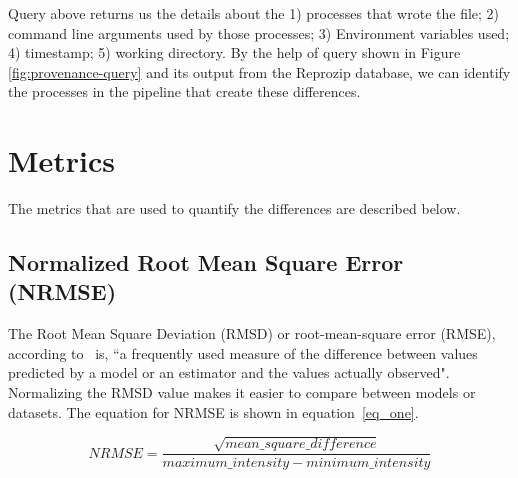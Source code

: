 Query above returns us the details about the 1) processes that wrote the file; 2) command line arguments used by those processes; 3) Environment variables used; 4) timestamp; 5) working directory. By the help of query shown in Figure \ref{fig:provenance-query} and its output from the Reprozip database, we can identify the processes in the pipeline that create these differences.

\section{Metrics} \label{sec:num1}
The metrics that are used to quantify the differences are described below.

\subsection{Normalized Root Mean Square Error (NRMSE)}
The Root Mean Square Deviation (RMSD) or root-mean-square error (RMSE), according to~\cite{khosrow2017handbook} is, ``a frequently used measure of the difference between values predicted by a model or an estimator and the values actually observed". Normalizing the RMSD value makes it easier to compare between models or datasets. The equation for NRMSE is shown in equation~\ref{eq_one}.

\begin{equation}
  \label{eq_one}
    NRMSE = \frac{\sqrt{mean\_square\_difference}}{maximum\_intensity - minimum\_intensity}
\end{equation}

\iffalse
\hrulefill
\caption*{\textbf{Algorithm 2:} Algorithm for finding the normalized root mean square value}
\label{alg:algorithm_diff}
\hrulefill

\DontPrintSemicolon
\SetKwFunction{FMain}{Convert\_image}
\SetKwProg{Fn}{Function}{:}{}
\Fn{\FMain{$image$}}{
  \begin{algorithmic}[1]
    \IF{image extension is ``.mgz":}
      \STATE convert image to ``.nii"
    \ELSE
      \STATE do nothing
    \ENDIF
  \end{algorithmic}
\KwRet image\;
}
\hfill \break
\hfill \break
\SetKwFunction{FNrmse}{Get\_NRMSE}
\SetKwProg{Pn}{Function}{:}{}
\Pn{\FNrmse{$image\-1$,$image\-2$}}{
  \begin{algorithmic}[1]
    \STATE image\_1 $\leftarrow$ Convert\_image(image\-1);
    \STATE image\_2 $\leftarrow$ Convert\_image(image\-2);
    \STATE minimum\_intensity $\leftarrow$ get the min. intensity value from image\_1; \COMMENT{using FSL}
    \STATE maximum\_intensity $\leftarrow$ get the max. intensity value from image\_1;
    \STATE \textbf{fslmaths} image\-1 \text{-sub} image\-2 \text{-sqr} $\rightarrow$ diff; \COMMENT{computing the mean square difference using FSL}
    \STATE meandifference $\leftarrow$ \textbf{fslstats} diff -m ; \COMMENT{get the mean square difference}
    \STATE \textbf{NRMSE} $\leftarrow$ $\sqrt{\frac{mean\_difference}{maximum\_intensity-minimum\_intensity}}$; \COMMENT{Normalized root mean square error value}
  \end{algorithmic}
\KwRet NRMSE\;
}
\fi

